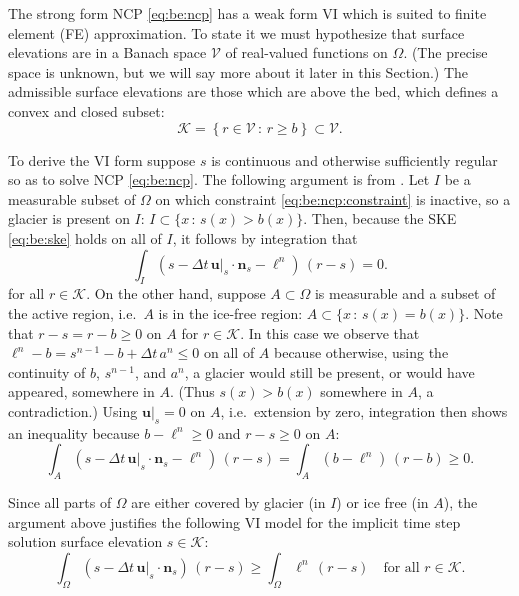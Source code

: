 \documentclass[hidelinks,onefignum,onetabnum,final]{siamart220329}  %
\newcommand{\bn}{\mathbf{n}}
\newcommand{\bu}{\mathbf{u}}
\newcommand{\cK}{\mathcal{K}}
\newcommand{\cV}{\mathcal{V}}
\begin{document}
The strong form NCP \eqref{eq:be:ncp} has a weak form VI which is suited to finite element (FE) approximation.  To state it we must hypothesize that surface elevations are in a Banach space $\cV$ of real-valued functions on $\Omega$.  (The precise space is unknown, but we will say more about it later in this Section.)  The admissible surface elevations are those which are above the bed, which defines a convex and closed subset:
\begin{equation}
\cK = \left\{r \in\cV\,:\,r \ge b\right\} \subset \cV.  \label{eq:be:admissible}
\end{equation}

To derive the VI form suppose $s$ is continuous and otherwise sufficiently regular so as to solve NCP \eqref{eq:be:ncp}.  The following argument is from \cite{Bueler2021conservation}.  Let $I$ be a measurable subset of $\Omega$ on which constraint \eqref{eq:be:ncp:constraint} is inactive, so a glacier is present on $I$: $I \subset \{x\,:\,s(x)>b(x)\}$.    Then, because the SKE \eqref{eq:be:ske} holds on all of $I$, it follows by integration that
\begin{equation}
\int_I \left(s - \Delta t\,\bu|_s \cdot \bn_s - \ell^n\right)\,(r-s) = 0.
\end{equation}
for all $r\in\cK$.  On the other hand, suppose $A \subset \Omega$ is measurable and a subset of the active region, i.e.~$A$ is in the ice-free region: $A \subset \{x\,:\,s(x)=b(x)\}$.  Note that $r-s=r-b\ge 0$ on $A$ for $r\in\cK$.  In this case we observe that $\ell^n - b = s^{n-1} - b + \Delta t\,a^n\le 0$ on all of $A$ because otherwise, using the continuity of $b$, $s^{n-1}$, and $a^n$, a glacier would still be present, or would have appeared, somewhere in $A$.  (Thus $s(x)>b(x)$ somewhere in $A$, a contradiction.)  Using $\bu|_s=0$ on $A$, i.e.~extension by zero, integration then shows an inequality because $b-\ell^n \ge 0$ and $r-s\ge 0$ on $A$:
\begin{equation}
\int_A \left(s - \Delta t\,\bu|_s \cdot \bn_s - \ell^n\right)\,(r-s) = \int_A \left(b - \ell^n\right)\,(r-b) \ge 0.
\end{equation}

Since all parts of $\Omega$ are either covered by glacier (in $I$) or ice free (in $A$), the argument above justifies the following VI model for the implicit time step solution surface elevation $s \in \cK$:
\begin{equation}
\int_\Omega \left(s - \Delta t\,\bu|_s \cdot \bn_s\right)\,(r-s) \ge \int_\Omega \ell^n \,(r-s) \quad \text{for all } r \in \cK. \label{eq:be:viearly}
\end{equation}
	
\end{document}
